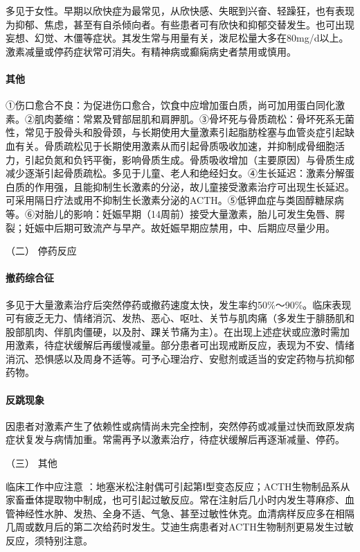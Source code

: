 多见于女性。早期以欣快症为最常见，从欣快感、失眠到兴奋、轻躁狂，也有表现为抑郁、焦虑，甚至有自杀倾向者。有些患者可有欣快和抑郁交替发生。也可出现妄想、幻觉、木僵等症状。其发生常与用量有关，泼尼松量大多在80mg/d以上。激素减量或停药症状常可消失。有精神病或癫痫病史者禁用或慎用。

\paragraph{其他}

①伤口愈合不良：为促进伤口愈合，饮食中应增加蛋白质，尚可加用蛋白同化激素。②肌肉萎缩：常累及臂部屈肌和肩胛肌。③骨坏死与骨质疏松：骨坏死系无菌性，常见于股骨头和股骨颈，与长期使用大量激素引起脂肪栓塞与血管炎症引起缺血有关。骨质疏松见于长期使用激素从而引起骨质吸收加速，并抑制成骨细胞活力，引起负氮和负钙平衡，影响骨质生成。骨质吸收增加（主要原因）与骨质生成减少逐渐引起骨质疏松。多见于儿童、老人和绝经妇女。④生长延迟：激素分解蛋白质的作用强，且能抑制生长激素的分泌，故儿童接受激素治疗可出现生长延迟。可采用隔日疗法或用不抑制生长激素分泌的ACTH。⑤低钾血症与类固醇糖尿病等。⑥对胎儿的影响：妊娠早期（14周前）接受大量激素，胎儿可发生兔唇、腭裂；妊娠中后期可致流产与早产。故妊娠早期应禁用，中、后期应尽量少用。

\hypertarget{text00428.htmlux5cux23CHP17-6-5-2}{}
（二） 停药反应

\paragraph{撤药综合征}

多见于大量激素治疗后突然停药或撤药速度太快，发生率约50\%～90\%。临床表现可有疲乏无力、情绪消沉、发热、恶心、呕吐、关节与肌肉痛（多发生于腓肠肌和股部肌肉、伴肌肉僵硬，以及肘、踝关节痛为主）。在出现上述症状或应激时需加用激素，待症状缓解后再缓慢减量。部分患者可出现戒断反应，表现为不安、情绪消沉、恐惧感以及周身不适等。可予心理治疗、安慰剂或适当的安定药物与抗抑郁药物。

\paragraph{反跳现象}

因患者对激素产生了依赖性或病情尚未完全控制，突然停药或减量过快而致原发病症状复发与病情加重。常需再予以激素治疗，待症状缓解后再逐渐减量、停药。

\hypertarget{text00428.htmlux5cux23CHP17-6-5-3}{}
（三） 其他

临床工作中应注意
：地塞米松注射偶可引起第Ⅰ型变态反应；ACTH生物制品系从家畜垂体提取物中制成，也可引起过敏反应。常在注射后几小时内发生荨麻疹、血管神经性水肿、发热、全身不适、气急、甚至过敏性休克。血清病样反应多在相隔几周或数月后的第二次给药时发生。艾迪生病患者对ACTH生物制剂更易发生过敏反应，须特别注意。

